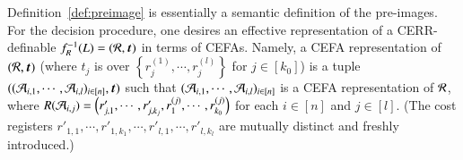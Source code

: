 Definition~\ref{def:preimage} is essentially a semantic definition of the pre-images. For the decision procedure, one desires an effective representation of a CERR-definable $f^{-1}_R(L)=(\cR, \vec{t})$ in terms of CEFAs. Namely,
a CEFA representation of %
$(\cR, \vec{t})$ (where $t_j$ is over $\left\{r^{(1)}_j, \cdots, r^{(l)}_j\right\}$ for $j\in [k_0]$)
is a tuple $((\CEFA_{i,1}, \cdots, \CEFA_{i, l})_{i \in [n]}, \vec{t})$ such that $(\mathcal{A}_{i,1}, \cdots, \mathcal{A}_{i, l})_{i \in [n]}$ is a CEFA representation of $\mathcal{R}$, where $R(\mathcal{A}_{i,j})=\left(r'_{j,1}, \cdots, r'_{j,k_j}, r^{(j)}_1, \cdots,r^{(j)}_{k_0}\right)$ for each $i \in [n]$ and $j \in [l]$. (The cost registers $r'_{1,1}, \cdots, r'_{1,k_1},\cdots, r'_{l,1}, \cdots, r'_{l,k_l}$ %
are mutually distinct and freshly introduced.) %


